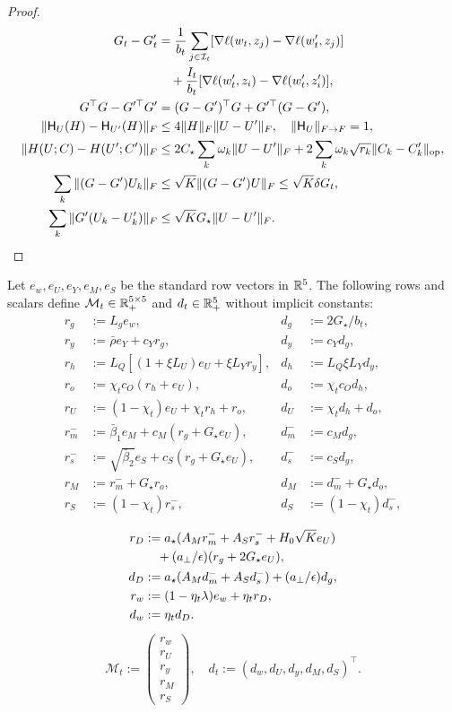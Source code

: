 \begin{proof}
\begin{align}
 G_t-G_t'&=\frac1{b_t}\sum_{j\in\mathcal I_t}
       [\nabla\ell(w_t,z_j)-\nabla\ell(w_t',z_j)]
       \notag\\
 &\quad+\frac{I_t}{b_t}[\nabla\ell(w_t',z_i)-\nabla\ell(w_t',z_i')],\\
 G^\top G-G'^\top G'&=(G-G')^\top G+G'^\top(G-G'),\\
 \|\mathsf H_U(H)-\mathsf H_{U'}(H)\|_F
 &\le4\|H\|_F\|U-U'\|_F,\quad\|\mathsf H_U\|_{F\to F}=1,\\
 \|H(U;C)-H(U';C')\|_F
 &\le2C_\star\sum_k\omega_k\|U-U'\|_F
       +2\sum_k\omega_k\sqrt{r_k}\|C_k-C_k'\|_{\mathrm{op}},\\
 \sum_k\|(G-G')U_k\|_F&\le\sqrt K\|(G-G')U\|_F\le\sqrt K\delta G_t,\\
 \sum_k\|G'(U_k-U_k')\|_F&\le\sqrt K G_\star\|U-U'\|_F.
\end{align}
\end{proof}
\begin{definition}\label{def:rigid-transition}
Let $e_w,e_U,e_Y,e_M,e_S$ be the standard row vectors in $\mathbb R^5$.
The following rows and scalars define $\mathcal M_t\in\mathbb R_+^{5\times5}$ and
$d_t\in\mathbb R_+^5$ without implicit constants:
\begin{align}
 r_g&:=L_g e_w,& d_g&:=2G_\star/b_t,\\
 r_y&:=\bar\rho e_Y+c_Yr_g,& d_y&:=c_Yd_g,\\
 r_h&:=L_Q[(1+\xi L_U)e_U+\xi L_Yr_y],&d_h&:=L_Q\xi L_Yd_y,\\
 r_o&:=\chi_t c_O(r_h+e_U),&d_o&:=\chi_t c_Od_h,\\
 r_U&:=(1-\chi_t)e_U+\chi_t r_h+r_o,&d_U&:=\chi_t d_h+d_o,\\
 r_m^-&:=\bar\beta_1 e_M+c_M(r_g+G_\star e_U),&d_m^-&:=c_Md_g,\\
 r_s^-&:=\sqrt{\bar\beta_2}e_S+c_S(r_g+G_\star e_U),&d_s^-&:=c_Sd_g,\\
 r_M&:=r_m^-+G_\star r_o,&d_M&:=d_m^-+G_\star d_o,\\
 r_S&:=(1-\chi_t)r_s^-,&d_S&:=(1-\chi_t)d_s^-,\\
 \end{align}
\begin{align}
 r_D&:=a_\star(A_Mr_m^-+A_Sr_s^-+H_0\sqrt K e_U)\notag\\
 &\quad+(a_\perp/\epsilon)(r_g+2G_\star e_U),\\
 d_D&:=a_\star(A_Md_m^-+A_Sd_s^-)+(a_\perp/\epsilon)d_g,\\
 r_w&:=(1-\eta_t\lambda)e_w+\eta_t r_D,\\
 d_w&:=\eta_t d_D.
\end{align}
\begin{gather}
 \mathcal M_t:=\begin{pmatrix}r_w\\r_U\\r_y\\r_M\\r_S\end{pmatrix},\quad
 d_t:=(d_w,d_U,d_y,d_M,d_S)^\top.
\end{gather}
\end{definition}
